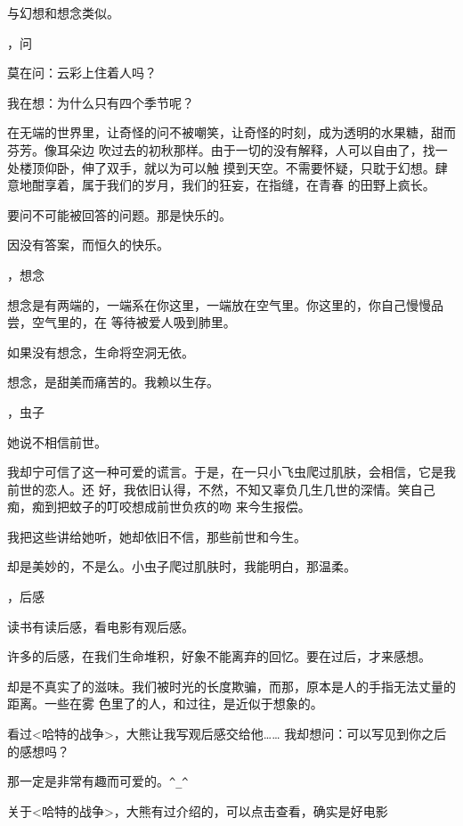 \documentclass[12pt,a4paper]{article}
\def\blankrev{\vspace{1ex}}									%
\newcommand{\subpart}[1]{
	\begingroup \par
	\vspace{1ex} \centering #1
	\par \endgroup \nopagebreak[4]
}
\begin{document}
		与幻想和想念类似。

	\endwriting



	\subpart{1，问}

		莫在问：云彩上住着人吗？

		我在想：为什么只有四个季节呢？

		\blankrev
		在无端的世界里，让奇怪的问不被嘲笑，让奇怪的时刻，成为透明的水果糖，甜而芬芳。像耳朵边
	吹过去的初秋那样。由于一切的没有解释，人可以自由了，找一处楼顶仰卧，伸了双手，就以为可以触
	摸到天空。不需要怀疑，只耽于幻想。肆意地酣享着，属于我们的岁月，我们的狂妄，在指缝，在青春
	的田野上疯长。

		要问不可能被回答的问题。那是快乐的。

		因没有答案，而恒久的快乐。


	\subpart{2，想念}

		想念是有两端的，一端系在你这里，一端放在空气里。你这里的，你自己慢慢品尝，空气里的，在
	等待被爱人吸到肺里。

		如果没有想念，生命将空洞无依。

		想念，是甜美而痛苦的。我赖以生存。


	\subpart{3，虫子}

		她说不相信前世。

		我却宁可信了这一种可爱的谎言。于是，在一只小飞虫爬过肌肤，会相信，它是我前世的恋人。还
	好，我依旧认得，不然，不知又辜负几生几世的深情。笑自己痴，痴到把蚊子的叮咬想成前世负疚的吻
	来今生报偿。

		我把这些讲给她听，她却依旧不信，那些前世和今生。

		却是美妙的，不是么。小虫子爬过肌肤时，我能明白，那温柔。


	\subpart{4，后感}

		读书有读后感，看电影有观后感。

		许多的后感，在我们生命堆积，好象不能离弃的回忆。要在过后，才来感想。

		却是不真实了的滋味。我们被时光的长度欺骗，而那，原本是人的手指无法丈量的距离。一些在雾
	色里了的人，和过往，是近似于想象的。

		看过<哈特的战争>，大熊让我写观后感交给他…… 我却想问：可以写见到你之后的感想吗？

		那一定是非常有趣而可爱的。\verb|^_^|

		关于<哈特的战争>，大熊有过介绍的，可以点击查看，确实是好电影

\end{document}

